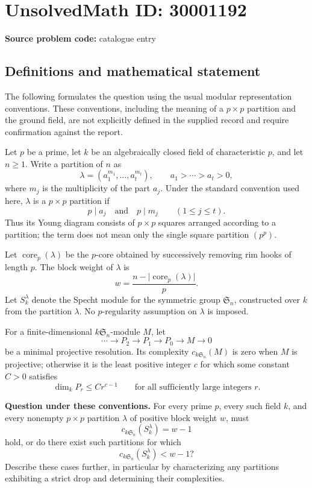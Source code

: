 \documentclass[11pt]{article}
\begin{document}
\section*{UnsolvedMath ID: 30001192}
\textbf{Source problem code:} catalogue entry
\subsection{Definitions and mathematical statement}
The following formulates the question using the usual modular representation conventions. These conventions, including the meaning of a \(p\times p\) partition and the ground field, are not explicitly defined in the supplied record and require confirmation against the report.

Let \(p\) be a prime, let \(k\) be an algebraically closed field of characteristic \(p\), and let \(n\geq 1\). Write a partition of \(n\) as
\[
\lambda=(a_1^{m_1},\ldots,a_t^{m_t}),\qquad a_1>\cdots>a_t>0,
\]
where \(m_j\) is the multiplicity of the part \(a_j\). Under the standard convention used here, \(\lambda\) is a \(p\times p\) partition if
\[
p\mid a_j\quad\text{and}\quad p\mid m_j\qquad(1\leq j\leq t).
\]
Thus its Young diagram consists of \(p\times p\) squares arranged according to a partition; the term does not mean only the single square partition \((p^p)\).

Let \(\operatorname{core}_p(\lambda)\) be the \(p\)-core obtained by successively removing rim hooks of length \(p\). The block weight of \(\lambda\) is
\[
w=\frac{n-\lvert\operatorname{core}_p(\lambda)\rvert}{p}.
\]
Let \(S_k^\lambda\) denote the Specht module for the symmetric group \(\mathfrak S_n\), constructed over \(k\) from the partition \(\lambda\). No \(p\)-regularity assumption on \(\lambda\) is imposed.

For a finite-dimensional \(k\mathfrak S_n\)-module \(M\), let
\[
\cdots\longrightarrow P_2\longrightarrow P_1\longrightarrow P_0\longrightarrow M\longrightarrow0
\]
be a minimal projective resolution. Its complexity \(c_{k\mathfrak S_n}(M)\) is zero when \(M\) is projective; otherwise it is the least positive integer \(c\) for which some constant \(C>0\) satisfies
\[
\dim_k P_r\leq C r^{c-1}
\qquad\text{for all sufficiently large integers }r.
\]

\textbf{Question under these conventions.} For every prime \(p\), every such field \(k\), and every nonempty \(p\times p\) partition \(\lambda\) of positive block weight \(w\), must
\[
c_{k\mathfrak S_n}(S_k^\lambda)=w-1
\]
hold, or do there exist such partitions for which
\[
c_{k\mathfrak S_n}(S_k^\lambda)<w-1?
\]
Describe these cases further, in particular by characterizing any partitions exhibiting a strict drop and determining their complexities.
\end{document}
